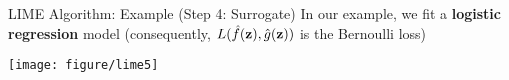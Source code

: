 \documentclass[11pt,compress,t,notes=noshow, aspectratio=169, xcolor=table]{beamer}
\newcommand{\gh}{\hat{g}}
\begin{document}
\begin{frame}[c]{LIME Algorithm: Example (Step 4: Surrogate) }
		In our example, we fit a \textbf{logistic regression} model (consequently, $L(\fh(\zv), \gh(\zv))$ is the Bernoulli loss)
		\begin{center}
			\texttt{[image: figure/lime5]}
		\end{center}
\end{frame}

\endlecture
\end{document}
